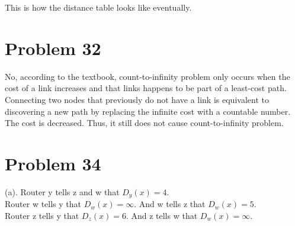 \documentclass[titlepage, paper=a4, fontsize=11pt]{scrartcl} %
\numberwithin{equation}{section} %
\numberwithin{table}{section} %
\begin{document}
This is how the distance table looks like eventually. \\




\section*{Problem 32}
No, according to the textbook, count-to-infinity problem only occurs when the cost of a link increases and that links happens to be part of a least-cost path. Connecting two nodes that previously do not have a link is equivalent to discovering a new path by replacing the infinite cost with a countable number. The cost is decreased. Thus, it still does not cause count-to-infinity problem. \\




\section*{Problem 34}
(a).
Router y tells z and w that $D_y(x) = 4$. \\
Router w tells y that $D_w(x) = \infty$. And w tells z that $D_w(x) = 5$. \\
Router z tells y that $D_z(x) = 6$. And z tells w that $D_w(x) = \infty$. \\
\end{document}
